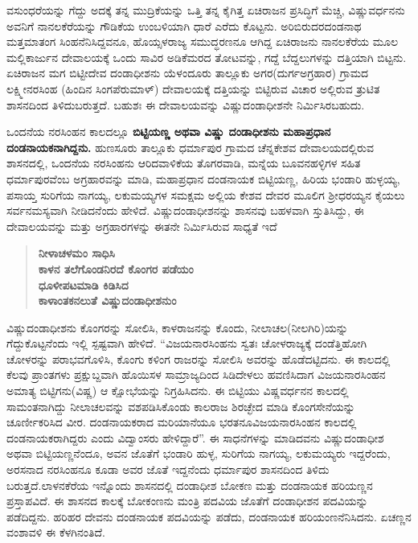 ವಸುಂಧರೆಯನ್ನು ಗೆದ್ದು ಅದಕ್ಕೆ ತನ್ನ ಮುದ್ರಿಕೆಯನ್ನು ಒತ್ತಿ ತನ್ನ ಕೈಗಿತ್ತ ಏಚಿರಾಜನ ಪ್ರಸಿದ್ಧಿಗೆ ಮೆಚ್ಚಿ, ವಿಷ್ಣುವರ್ಧನನು ಅವನಿಗೆ ನಾನಲಕೆರೆಯನ್ನು ಗೌಡಿಕೆಯ ಉಂಬಳಿಯಾಗಿ ಧಾರೆ ಎರೆದು ಕೊಟ್ಟನು. ಅರಿಬಿರುದರದಂಡನಾಥ ಮತ್ತಮಾತಂಗ ಸಿಂಹನೆನಿಸಿದ್ದವನೂ, ಹೊಯ್ಸಳರಾಜ್ಯ ಸಮುದ್ಧರಣನೂ ಆಗಿದ್ದ ಏಚಿರಾಜನು ನಾನಲಕೆರೆಯ ಮೂಲ ಮಲ್ಲಿಕಾರ್ಜುನ ದೇವಾಲಯಕ್ಕೆ ಒಂದು ಸಾವಿರ ಅಡಿಕೆಮರದ ತೋಟವನ್ನು, ಗದ್ದೆ ಬೆದ್ದಲುಗಳನ್ನು ದತ್ತಿಯಾಗಿ ಬಿಟ್ಟನು. ಏಚಿರಾಜನ ಮಗ ಬಿಟ್ಟೀದೇವ ದಂಡಾಧೀಶನು ಯೆಳಂದೂರು ತಾಲ್ಲೂಕು ಅಗರ(ದುರ್ಗಅಗ್ರಹಾರ) ಗ್ರಾಮದ ಲಕ್ಷ್ಮೀನರಸಿಂಹ (ಹಿಂದಿನ ಸಿಂಗಪೆರುಮಾಳ್​) ದೇವಾಲಯಕ್ಕೆ ದತ್ತಿಯನ್ನು ಬಿಟ್ಟಿರುವ ವಿಚಾರ ಅಲ್ಲಿರುವ ತ್ರುಟಿತ ಶಾಸನದಿಂದ ತಿಳಿದುಬರುತ್ತದೆ. ಬಹುಶಃ ಈ ದೇವಾಲಯವನ್ನು ವಿಷ್ಣುದಂಡಾಧೀಶನೇ ನಿರ್ಮಿಸಿರಬಹುದು.

ಒಂದನೆಯ ನರಸಿಂಹನ ಕಾಲದಲ್ಲೂ \textbf{ಬಿಟ್ಟಿಯಣ್ಣ ಅಥವಾ ವಿಷ್ಣು ದಂಡಾಧೀಶನು ಮಹಾಪ್ರಧಾನ ದಂಡನಾಯಕ\-ನಾಗಿದ್ದನು.} ಹುಣಸೂರು ತಾಲ್ಲೂಕು ಧರ್ಮಾಪುರ ಗ್ರಾಮದ ಚೆನ್ನಕೇಶವ ದೇವಾಲಯದಲ್ಲಿರುವ ಶಾಸನದಲ್ಲಿ, ಒಂದನೆಯ ನರಸಿಂಹನು ಆರಿದವಾಳಿಕೆಯ ತೊಗರವಾಡಿ, ಮನ್ನೆಯ ಬೂವನಹಳ್ಳಿಗಳ ಸಹಿತ ಧರ್ಮಾಪುರವೆಂಬ ಅಗ್ರಹಾರವನ್ನು ಮಾಡಿ, ಮಹಾಪ್ರಧಾನ ದಂಡನಾಯಕ ಬಿಟ್ಟಿಯಣ್ಣ, ಹಿರಿಯ ಭಂಡಾರಿ ಹುಳ್ಳಯ್ಯ, ಪಸಾಯ್ತ ಸುರಿಗೆಯ ನಾಗಯ್ಯ, ಲಕುಮಯ್ಯಗಳ ಸಮಕ್ಷಮ ಅಲ್ಲಿಯ ಕೇಶವ ದೇವರ ಮೂಲಿಗ ಶ‍್ರೀಧರಯ್ಯನ ಕೈಯಲು ಸರ್ವನಮಸ್ಯವಾಗಿ ನೀಡಿದನೆಂದು ಹೇಳಿದೆ. ವಿಷ್ಣುದಂಡಾಧೀಶ\-ನನ್ನು ಶಾಸನವು ಬಹಳವಾಗಿ ಸ್ತುತಿಸಿದ್ದು, ಈ ದೇವಾಲಯವನ್ನು ಮತ್ತು ಅಗ್ರಹಾರಗಳನ್ನು ಈತನೇ ನಿರ್ಮಿಸಿರುವ ಸಾಧ್ಯತೆ ಇದೆ

\begin{verse}
\textbf{ನೀಳಾಚಳಮಂ ಸಾಧಿಸಿ} \\\textbf{ಕಾಳನ ತಲೆಗೊಂಡನಿರದೆ ಕೊಂಗರ ಪಡೆಯಂ} \\\textbf{ಧೂಳೀಪಟಮಾಡಿ ಕಿಡಿಸಿದ} \\\textbf{ಕಾಳಾಂತಕನಲುತೆ ವಿಷ್ಣುದಂಡಾಧೀಶನುಂ}
\end{verse}

ವಿಷ್ಣುದಂಡಾಧೀಶನು ಕೊಂಗರನ್ನು ಸೋಲಿಸಿ, ಕಾಳರಾಜನನ್ನು ಕೊಂದು, ನೀಲಾಚಲ(ನೀಲಗಿರಿ)ಯನ್ನು ಗೆದ್ದು\-ಕೊಟ್ಟನೆಂದು ಇಲ್ಲಿ ಸ್ಪಷ್ಟವಾಗಿ ಹೇಳಿದೆ. “ವಿಜಯನಾರಸಿಂಹನು ಸ್ವತಃ ಚೋಳರಾಜ್ಯಕ್ಕೆ ದಂಡೆತ್ತಿಹೋಗಿ ಚೋಳರನ್ನು ಪರಾಭವಗೊಳಿಸಿ, ಕೊಂಗು ಕಳಿಂಗ ರಾಜರನ್ನು ಸೋಲಿಸಿ ಅವರನ್ನು ಹೊಡೆದಟ್ಟಿದನು. ಈ ಕಾಲದಲ್ಲಿ ಕೆಲವು ಪ್ರಾಂತಗಳು ಪ್ರಕ್ಷುಬ್ದವಾಗಿ ಹೊಯಿಸಳ ಸಾಮ್ರಾಜ್ಯದಿಂದ ಸಿಡಿದೇಳಲು ಹವಣಿಸಿದಾಗ ವಿಜಯನಾರಸಿಂಹನ ಅಮಾತ್ಯ ಬಿಟ್ಟಿಗನು(ವಿಷ್ಣ) ಆ ಕ್ಷೋಭೆಯನ್ನು ನಿಗ್ರಹಿಸಿದನು. ಈ ಬಿಟ್ಟಿಯು ವಿಷ್ಣವರ್ಧನನ ಕಾಲದಲ್ಲಿ ಸಾಮಂತನಾಗಿದ್ದು ನೀಲಾಚಲವನ್ನು ವಶಪಡಿಸಿಕೊಂಡು ಕಾಲರಾಜ ಶಿರಚ್ಛೇದ ಮಾಡಿ ಕೊಂಗಸೇನೆಯನ್ನು ಚೂರ್ಣೀಕರಿಸಿದ ವೀರ. ದಂಡನಾಯಕರಾದ ಮರಿಯಾನೆಯೂ ಭರತನೂ\break ವಿಜಯನಾರಸಿಂಹನ ಕಾಲದಲ್ಲಿ ದಂಡನಾಯಕರಾಗಿದ್ದರು ಎಂದು ವಿದ್ವಾಂಸರು ಹೇಳಿದ್ದಾರೆ”. ಈ ಸಾಧನೆಗಳನ್ನು ಮಾಡಿದವನು ವಿಷ್ಣುದಂಡಾಧೀಶ ಅಥವಾ ಬಿಟ್ಟಿಯಣ್ಣನೆಂದೂ, ಅವನ ಜೊತೆಗೆ ಭಂಡಾರಿ ಹುಳ್ಳ, ಸುರಿಗೆಯ ನಾಗಯ್ಯ, ಲಕುಮಯ್ಯರು ಇದ್ದರೆಂದು, ಅರಸನಾದ ನರಸಿಂಹನೂ ಕೂಡಾ ಅವರ ಜೊತೆ ಇದ್ದನೆಂದು ಧರ್ಮಾಪುರ ಶಾಸನದಿಂದ ತಿಳಿದು ಬರುತ್ತದೆ.ಲಾಳನಕೆರೆಯ ಇನ್ನೊಂದು ಶಾಸನದಲ್ಲಿ ದಂಡಾಧೀಶ ಬೋಕಣ ಮತ್ತು ದಂಡನಾಯಕ ಹರಿಯಣ್ಣನ ಪ್ರಸ್ತಾಪ\-ವಿದೆ. ಈ ಶಾಸನದ ಕಾಲಕ್ಕೆ ಬೋಕಂಣನು ಮಂತ್ರಿ ಪದವಿಯ ಜೊತೆಗೆ ದಂಡಾಧೀಶನ ಪದವಿಯನ್ನು ಪಡೆದಿದ್ದನು. ಹರಿಹರ ದೇವನು ದಂಡನಾಯಕ ಪದವಿಯನ್ನು ಪಡೆದು, ದಂಡನಾಯಕ ಹರಿಯಂಣನೆನಿಸಿದನು. ಏಚಣ್ಣನ ವಂಶಾವಳಿ ಈ ಕೆಳಗಿನಂತಿದೆ.

